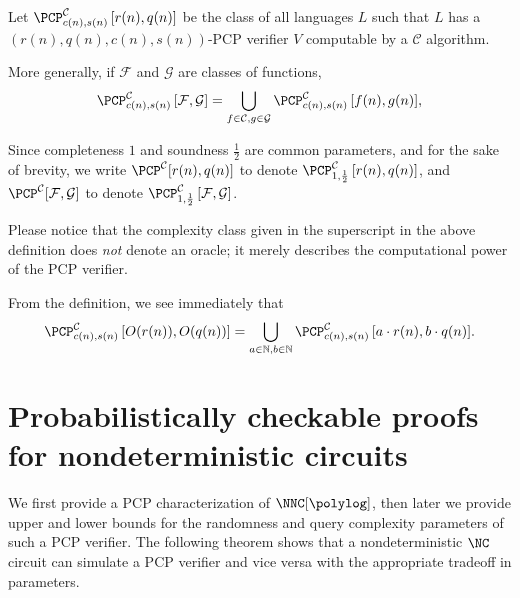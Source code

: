 \begin{definition}
  Let $\PCPcs{\mathcal{C}}{c(n)}{s(n)}{r(n)}{q(n)}$ be the class of all languages $L$ such that $L$ has a $(r(n), q(n), c(n), s(n))$-PCP verifier $V$ computable by a $\mathcal{C}$ algorithm.

  More generally, if $\mathcal{F}$ and $\mathcal{G}$ are classes of functions,
  \begin{equation*}
    \PCPcs{\mathcal{C}}{c(n)}{s(n)}{\mathcal{F}}{\mathcal{G}} = \bigcup_{f \in \mathcal{C}, g \in \mathcal{G}}{\PCPcs{\mathcal{C}}{c(n)}{s(n)}{f(n)}{g(n)}},
    \end{equation*}

  Since completeness $1$ and soundness $\frac{1}{2}$ are common parameters, and for the sake of brevity, we write $\PCP^{\mathcal{C}}[r(n), q(n)]$ to denote $\PCPcs{\mathcal{C}}{1}{\frac{1}{2}}{r(n)}{q(n)}$, and $\PCP^{\mathcal{C}}[\mathcal{F}, \mathcal{G}]$ to denote $\PCPcs{\mathcal{C}}{1}{\frac{1}{2}}{\mathcal{F}}{\mathcal{G}}$.
\end{definition}

Please notice that the complexity class given in the superscript in the above definition does \emph{not} denote an oracle; it merely describes the computational power of the PCP verifier.

From the definition, we see immediately that
\begin{equation*}
  \PCPcs{\mathcal{C}}{c(n)}{s(n)}{O(r(n))}{O(q(n))} = \bigcup_{a \in \mathbb{N}, b \in \mathbb{N}}{\PCPcs{\mathcal{C}}{c(n)}{s(n)}{a \cdot r(n)}{b \cdot q(n)}}.
\end{equation*}

\section{Probabilistically checkable proofs for nondeterministic circuits}

We first provide a PCP characterization of $\NNC[\polylog]$, then later we provide upper and lower bounds for the randomness and query complexity parameters of such a PCP verifier.
The following theorem shows that a nondeterministic $\NC$ circuit can simulate a PCP verifier and vice versa with the appropriate tradeoff in parameters.

